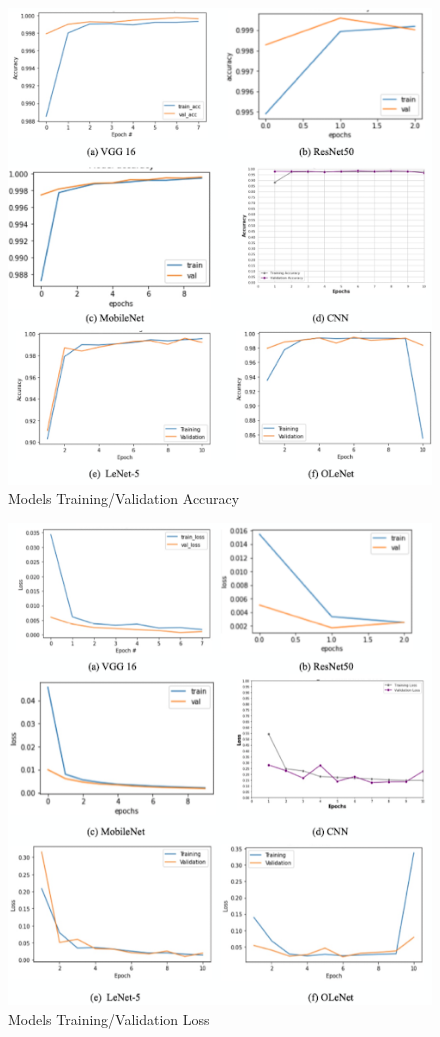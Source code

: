 \documentclass[conference]{IEEEtran}
\begin{document}
\begin{figure}[htbp]
\centerline{\includegraphics[scale=0.45]{Fig2_accuracy_plot.png}}
\caption{Models Training/Validation Accuracy}
\label{fig}
\end{figure}
\begin{figure}[htbp]
\centerline{\includegraphics[scale=0.50]{Fig3_loss_plot.png}}
\caption{Models Training/Validation Loss}
\label{fig}
\end{figure}
\end{document}

